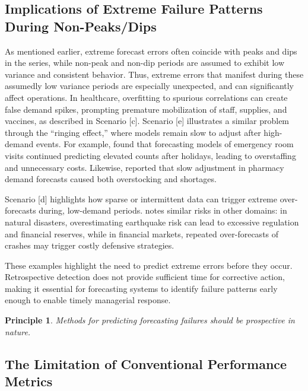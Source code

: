 \documentclass[preprint,12pt]{elsarticle}
\newtheorem{principle}{Principle}
\begin{document}
\subsection{Implications of Extreme Failure Patterns During Non-Peaks/Dips}

As mentioned earlier, extreme forecast errors often coincide with peaks and dips in the series, while non-peak and non-dip periods are assumed to exhibit low variance and consistent behavior. Thus, extreme errors that manifest during these assumedly low variance periods are especially unexpected, and can significantly affect operations. In healthcare, overfitting to spurious correlations can create false demand spikes, prompting premature mobilization of staff, supplies, and vaccines, as described in Scenario [c]. Scenario [e] illustrates a similar problem through the “ringing effect,” where models remain slow to adjust after high-demand events. For example, \citet{Burkom2007} found that forecasting models of emergency room visits continued predicting elevated counts after holidays, leading to overstaffing and unnecessary costs. Likewise, \citet{lopez2014} reported that slow adjustment in pharmacy demand forecasts caused both overstocking and shortages.

Scenario [d] highlights how sparse or intermittent data can trigger extreme over-forecasts during, low-demand periods. \citet{nikolopoulos2021} notes similar risks in other domains: in natural disasters, overestimating earthquake risk can lead to excessive regulation and financial reserves, while in financial markets, repeated over-forecasts of crashes may trigger costly defensive strategies.

These examples highlight the need to predict extreme errors before they occur. Retrospective detection does not provide sufficient time for corrective action, making it essential for forecasting systems to identify failure patterns early enough to enable timely managerial response.

\begin{principle}
\textit{Methods for predicting forecasting failures should be prospective in nature.}
\end{principle}

\subsection{The Limitation of Conventional Performance Metrics}
\end{document}
